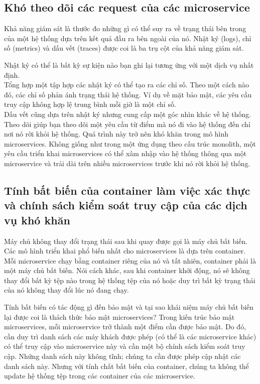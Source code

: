 \documentclass[12pt,a4paper]{report}
\begin{document}
			\subsection{Khó theo dõi các request của các microservice}
				{\hspace{0.6cm}Khả năng giám sát là thước đo những gì có thể suy ra về trạng thái bên trong của một hệ thống dựa trên kết quả đầu ra bên ngoài của nó. Nhật ký (logs), chỉ số (metrics) và dấu vết (traces) được coi là ba trụ cột của khả năng giám sát.\\}
				
				Nhật ký có thể là bất kỳ sự kiện nào bạn ghi lại tương ứng với một dịch vụ nhất định.\\
				
				Tổng hợp một tập hợp các nhật ký có thể tạo ra các chỉ số. Theo một cách nào đó, các chỉ số phản ánh trạng thái hệ thống. Ví dụ về mặt bảo mật, các yêu cầu truy cập không hợp lệ trung bình mỗi giờ là một chỉ số.\\
				
				Dấu vết cũng dựa trên nhật ký nhưng cung cấp một góc nhìn khác về hệ thống. Theo dõi giúp bạn theo dõi một yêu cầu từ điểm mà nó đi vào hệ thống đến chỉ nơi nó rời khỏi hệ thống. Quá trình này trở nên khó khăn trong mô hình microservices. Không giống như trong một ứng dụng theo cấu trúc monolith, một yêu cầu triển khai microservices có thể xâm nhập vào hệ thống thông qua một microservice và trải dài trên nhiều microservices trước khi nó rời khỏi hệ thống.			
			\subsection{Tính bất biến của container làm việc xác thực và chính sách kiểm soát truy cập của các dịch vụ khó khăn}
				{\hspace{0.6cm}Máy chủ không thay đổi trạng thái sau khi quay được gọi là máy chủ bất biến. Các mô hình triển khai phổ biến nhất cho microservices là dựa trên container. Mỗi microservice chạy bằng container riêng của nó và tất nhiên, container phải là một máy chủ bất biến. Nói cách khác, sau khi container khởi động, nó sẽ không thay đổi bất kỳ tệp nào trong hệ thống tệp của nó hoặc duy trì bất kỳ trạng thái của nó không thay đổi lúc nó đang chạy.\\}
				
				Tính bất biến có tác động gì đến bảo mật và tại sao khái niệm máy chủ bất biến lại được coi là thách thức bảo mật microservices? Trong kiến trúc bảo mật microservices, mỗi microservice trở thành một điểm cần được bảo mật. Do đó, cần duy trì danh sách các máy khách được phép (có thể là các microservice khác) có thể truy cập vào microservice này và cần một bộ chính sách kiểm soát truy cập. Những danh sách này không tĩnh; chúng ta cần được phép cập nhật các danh sách này. Nhưng với tính chất bất biến của container, chúng ta không thể update hệ thống tệp trong các container của các microservice.
\end{document}
